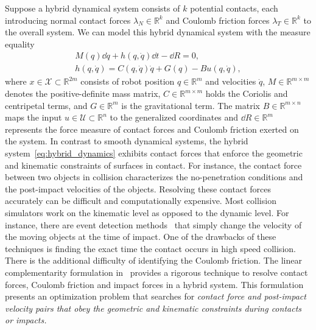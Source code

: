 Suppose a hybrid dynamical system consists of $k$ potential contacts, each
introducing normal contact forces $\lambda_N \in \mathbb{R}^{k}$ and Coulomb
friction forces $\lambda_T \in \mathbb{R}^{k}$ to the overall system.
%
We can model this hybrid dynamical system with the measure
equality~\cite{glocker2005formulation}
\begin{equation}
  \begin{gathered}
    M(q) \dd \dot{q} + h(q, \dot{q})\dd t - \dd R  = 0, \\
    h(q, \dot{q}) = C(q, \dot{q})\dot{q} + G(q) - Bu(q, \dot{q}), 
  \end{gathered}
  \label{eq:hybrid_dynamics}
\end{equation}
%
\noindent where $x \in \mathcal{X} \subset \mathbb{R}^{2m}$ consists of robot
position $q \in \mathbb{R}^m$ and velocities $\dot{q}$, $M \in \mathbb{R}^{m
\times m}$ denotes the positive-definite mass matrix, $C \in \mathbb{R}^{m
\times m}$ holds the Coriolis and centripetal terms, and $G \in \mathbb{R}^{m}$
is the gravitational term. The matrix $B \in \mathbb{R}^{m \times n}$ maps the
input $u \in \mathcal{U} \subset \mathbb{R}^{n}$ to the generalized coordinates
and $\dd R \in \mathbb{R}^m$ represents the force measure of contact forces and
Coulomb friction exerted on the system. 
%
In contrast to smooth dynamical systems, the hybrid
system~\eqref{eq:hybrid_dynamics} exhibits contact forces that enforce
the geometric and kinematic constraints of surfaces in contact.
%
For instance, the contact force between two objects in collision characterizes
the no-penetration conditions and the post-impact velocities of the objects.
%
Resolving these contact forces accurately can be difficult and computationally
expensive.
%
Most collision simulators work on the kinematic level as opposed to the dynamic
level.
%
For instance, there are event detection methods~\cite{cellier1986combined} that
simply change the velocity of the moving objects at the time of impact.
%
One of the drawbacks of these techniques is finding the exact time the contact
occurs in high speed collision.
%
There is the additional difficulty of identifying the Coulomb friction.
%
The linear complementarity formulation in~\cite{glocker2005formulation} provides
a rigorous technique to resolve contact forces, Coulomb friction and impact
forces in a hybrid system.
%
This formulation presents an optimization problem that searches for \it{contact force
and post-impact velocity} \normalfont pairs that obey the geometric and
kinematic constraints during contacts or impacts.
%

